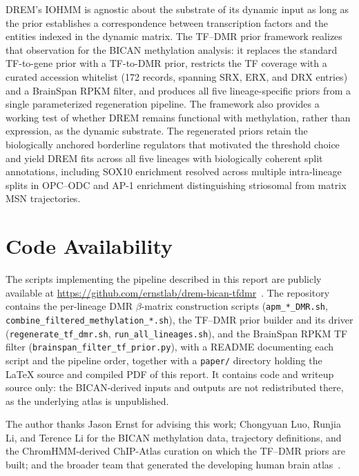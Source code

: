 \documentclass[sigconf,nonacm]{acmart}
\begin{document}
DREM's IOHMM is agnostic about the substrate of its dynamic input as
long as the prior establishes a correspondence between transcription
factors and the entities indexed in the dynamic matrix. The TF--DMR
prior framework realizes that observation for the BICAN methylation
analysis: it replaces the standard TF-to-gene prior with a
TF-to-DMR prior, restricts the TF coverage with a curated accession
whitelist (172 records, spanning SRX, ERX, and DRX entries) and a
BrainSpan RPKM filter, and produces all five lineage-specific priors
from a single parameterized regeneration pipeline. The framework also
provides a working test of whether DREM remains functional with
methylation, rather than expression, as the dynamic substrate. The
regenerated priors retain the biologically anchored borderline
regulators that motivated the threshold choice and yield DREM fits
across all five lineages with biologically coherent split
annotations, including SOX10 enrichment resolved across multiple
intra-lineage splits in OPC--ODC and AP-1 enrichment distinguishing
striosomal from matrix MSN trajectories.

\section{Code Availability}
\label{sec:code}

The scripts implementing the pipeline described in this report are
publicly available at
\url{https://github.com/ernstlab/drem-bican-tfdmr}~\cite{paino2026repo}.
The repository contains the per-lineage DMR $\beta$-matrix
construction scripts (\texttt{apm\_*\_DMR.sh},
\texttt{combine\_filtered\_methylation\_*.sh}), the TF--DMR prior
builder and its driver (\texttt{regenerate\_tf\_dmr.sh},
\texttt{run\_all\_lineages.sh}), and the BrainSpan RPKM TF filter
(\texttt{brainspan\_filter\_tf\_prior.py}), with a README documenting
each script and the pipeline order, together with a \texttt{paper/}
directory holding the \LaTeX{} source and compiled PDF of this
report. It contains code and writeup source only: the BICAN-derived
inputs and outputs are not redistributed there, as the underlying
atlas is unpublished.

\begin{acks}
The author thanks Jason Ernst for advising this work; Chongyuan Luo,
Runjia Li, and
Terence Li for the BICAN methylation data,
trajectory definitions, and the ChromHMM-derived ChIP-Atlas curation
on which the TF--DMR priors are built; and the broader team that
generated the developing human brain
atlas~\cite{bican2026manuscript}.
\end{acks}



\end{document}
